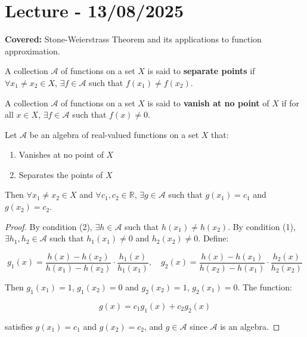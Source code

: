 \documentclass{functionspaces}
\begin{document}
\endgroup


\newpage
\section{Lecture - 13/08/2025}

\textbf{Covered:} Stone-Weierstrass Theorem and its applications to function approximation.

\begingroup
\setlength{\parskip}{6pt}
\setlength{\parindent}{0pt}

\begin{definition}
A collection $\mathcal{A}$ of functions on a set $X$ is said to \textbf{separate points} if $\forall x_1 \neq x_2 \in X$, $\exists f \in \mathcal{A}$ such that $f(x_1) \neq f(x_2)$.
\end{definition}

\begin{definition}
A collection $\mathcal{A}$ of functions on a set $X$ is said to \textbf{vanish at no point} of $X$ if for all $x \in X$, $\exists f \in \mathcal{A}$ such that $f(x) \neq 0$.
\end{definition}

\begin{theorem}
Let $\mathcal{A}$ be an algebra of real-valued functions on a set $X$ that:
\begin{enumerate}
\item Vanishes at no point of $X$
\item Separates the points of $X$
\end{enumerate}
Then $\forall x_1 \neq x_2 \in X$ and $\forall c_1, c_2 \in \mathbb{R}$, $\exists g \in \mathcal{A}$ such that $g(x_1) = c_1$ and $g(x_2) = c_2$.
\end{theorem}

\begin{proof}
By condition (2), $\exists h \in \mathcal{A}$ such that $h(x_1) \neq h(x_2)$. By condition (1), $\exists h_1, h_2 \in \mathcal{A}$ such that $h_1(x_1) \neq 0$ and $h_2(x_2) \neq 0$. Define:

\[
g_1(x) = \frac{h(x) - h(x_2)}{h(x_1) - h(x_2)} \cdot \frac{h_1(x)}{h_1(x_1)}, \quad 
g_2(x) = \frac{h(x) - h(x_1)}{h(x_2) - h(x_1)} \cdot \frac{h_2(x)}{h_2(x_2)}
\]

Then $g_1(x_1) = 1$, $g_1(x_2) = 0$ and $g_2(x_2) = 1$, $g_2(x_1) = 0$. The function:

\[
g(x) = c_1 g_1(x) + c_2 g_2(x)
\]

satisfies $g(x_1) = c_1$ and $g(x_2) = c_2$, and $g \in \mathcal{A}$ since $\mathcal{A}$ is an algebra.
\end{proof}
\end{document}

